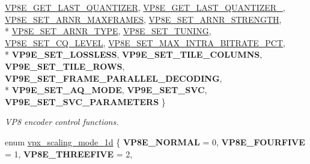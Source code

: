 \begin{DoxyCompactItemize}
\hyperlink{group__vp8__encoder_gga6deae3d561c838952552c3d3756322eca5bb0569b813853e981a61c97697cbecd}{V\+P8\+E\+\_\+\+G\+E\+T\+\_\+\+L\+A\+S\+T\+\_\+\+Q\+U\+A\+N\+T\+I\+Z\+E\+R}, 
\hyperlink{group__vp8__encoder_gga6deae3d561c838952552c3d3756322ecad2cfc9712d2eab30b5a59a60d0daaade}{V\+P8\+E\+\_\+\+G\+E\+T\+\_\+\+L\+A\+S\+T\+\_\+\+Q\+U\+A\+N\+T\+I\+Z\+E\+R\+\_}, 
\hyperlink{group__vp8__encoder_gga6deae3d561c838952552c3d3756322eca628d73f1a69fadd8aa57e0dfef578da8}{V\+P8\+E\+\_\+\+S\+E\+T\+\_\+\+A\+R\+N\+R\+\_\+\+M\+A\+X\+F\+R\+A\+M\+E\+S}, 
\hyperlink{group__vp8__encoder_gga6deae3d561c838952552c3d3756322eca0a8c40a768af935ae73faa53355c3244}{V\+P8\+E\+\_\+\+S\+E\+T\+\_\+\+A\+R\+N\+R\+\_\+\+S\+T\+R\+E\+N\+G\+T\+H}, 
\\*
\hyperlink{group__vp8__encoder_gga6deae3d561c838952552c3d3756322eca4e0a0af58670012026c213083cd48f3a}{V\+P8\+E\+\_\+\+S\+E\+T\+\_\+\+A\+R\+N\+R\+\_\+\+T\+Y\+P\+E}, 
\hyperlink{group__vp8__encoder_gga6deae3d561c838952552c3d3756322eca126ccbe7bde63b59cec5ea68a82dd498}{V\+P8\+E\+\_\+\+S\+E\+T\+\_\+\+T\+U\+N\+I\+N\+G}, 
\hyperlink{group__vp8__encoder_gga6deae3d561c838952552c3d3756322ecacd4f5b730bddb9788c3d0b82218ec503}{V\+P8\+E\+\_\+\+S\+E\+T\+\_\+\+C\+Q\+\_\+\+L\+E\+V\+E\+L}, 
\hyperlink{group__vp8__encoder_gga6deae3d561c838952552c3d3756322eca09c69ff4a3aabdb307d4f24027dfc4c1}{V\+P8\+E\+\_\+\+S\+E\+T\+\_\+\+M\+A\+X\+\_\+\+I\+N\+T\+R\+A\+\_\+\+B\+I\+T\+R\+A\+T\+E\+\_\+\+P\+C\+T}, 
\\*
{\bfseries V\+P9\+E\+\_\+\+S\+E\+T\+\_\+\+L\+O\+S\+S\+L\+E\+S\+S}, 
{\bfseries V\+P9\+E\+\_\+\+S\+E\+T\+\_\+\+T\+I\+L\+E\+\_\+\+C\+O\+L\+U\+M\+N\+S}, 
{\bfseries V\+P9\+E\+\_\+\+S\+E\+T\+\_\+\+T\+I\+L\+E\+\_\+\+R\+O\+W\+S}, 
{\bfseries V\+P9\+E\+\_\+\+S\+E\+T\+\_\+\+F\+R\+A\+M\+E\+\_\+\+P\+A\+R\+A\+L\+L\+E\+L\+\_\+\+D\+E\+C\+O\+D\+I\+N\+G}, 
\\*
{\bfseries V\+P9\+E\+\_\+\+S\+E\+T\+\_\+\+A\+Q\+\_\+\+M\+O\+D\+E}, 
{\bfseries V\+P9\+E\+\_\+\+S\+E\+T\+\_\+\+S\+V\+C}, 
{\bfseries V\+P9\+E\+\_\+\+S\+E\+T\+\_\+\+S\+V\+C\+\_\+\+P\+A\+R\+A\+M\+E\+T\+E\+R\+S}
 \}
\begin{DoxyCompactList}\small\item\em V\+P8 encoder control functions. \end{DoxyCompactList}\item 
enum \hyperlink{group__vp8__encoder_ga70071b1bb6cac9a1ef0ea3d8362ff94f}{vpx\+\_\+scaling\+\_\+mode\+\_\+1d} \{ {\bfseries V\+P8\+E\+\_\+\+N\+O\+R\+M\+A\+L} = 0, 
{\bfseries V\+P8\+E\+\_\+\+F\+O\+U\+R\+F\+I\+V\+E} = 1, 
{\bfseries V\+P8\+E\+\_\+\+T\+H\+R\+E\+E\+F\+I\+V\+E} = 2, 

\end{DoxyCompactItemize}
